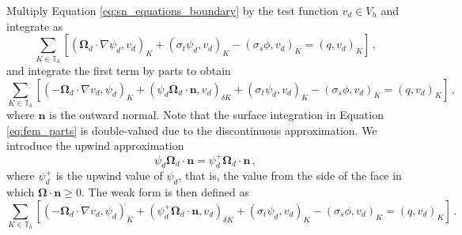 \documentclass{article}
\numberwithin{equation}{section}
\newcommand{\vo}{\mathbf{\Omega}} %
\newcommand{\vn}{\mathbf{n}} %
\newcommand{\pinp}[2]{\left(#1,#2\right)}
\begin{document}
Multiply Equation \eqref{eq:sn_equations_boundary} by the test function $v_d \in V_h$ and integrate as
\begin{equation}
	\label{eq:fem_integrate}
	\sum_{K \in \mathbb{T}_h} \left[ \pinp{\vo_d \cdot \nabla \psi_d}{v_d}_K + \pinp{\sigma_t \psi_d}{v_d}_K - \pinp{\sigma_s \phi}{v_d}_K = \pinp{q}{v_d}_K\right]\,,
\end{equation}
and integrate the first term by parts to obtain
\begin{equation}
	\label{eq:fem_parts}
	\sum_{K \in \mathbb{T}_h} \left[ \pinp{-\vo_d \cdot \nabla v_d}{\psi_d}_K + \pinp{\psi_d \vo_d \cdot \vn}{v_d}_{\delta K} + \pinp{\sigma_t \psi_d}{v_d}_K - \pinp{\sigma_s \phi}{v_d}_K = \pinp{q}{v_d}_K\right]\,,
\end{equation}
where $\vn$ is the outward normal. Note that the surface integration in Equation \eqref{eq:fem_parts} is double-valued due to the discontinuous approximation. We introduce the upwind approximation
\begin{equation}
	\psi_d \vo_d \cdot \vn = \psi^+_d \vo_d \cdot \vn\,,
\end{equation}
where $\psi_d^+$ is the upwind value of $\psi_d$, that is, the value from the side of the face in which $\vo \cdot \vn \geq 0$. The weak form is then defined as
\begin{equation}
	\label{eq:fem_upwind}
	\sum_{K \in \mathbb{T}_h} \left[ \pinp{-\vo_d \cdot \nabla v_d}{\psi_d}_K + \pinp{\psi_d^+ \vo_d \cdot \vn}{v_d}_{\delta K} + \pinp{\sigma_t \psi_d}{v_d}_K - \pinp{\sigma_s \phi}{v_d}_K = \pinp{q}{v_d}_K\right]\,.
\end{equation}
\end{document}
